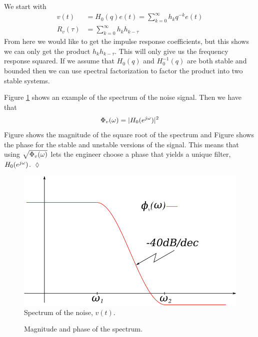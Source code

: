 \documentclass[lecture,12pt,]{pcms-l}
\begin{document}
We start with
\begin{align*}
v(t) &= H_0(q)e(t) = \sum_{k=0}^\infty h_kq^{-k}e(t) \\
R_v(\tau) &= \sum_{k=0}^\infty h_kh_{k-\tau}
\end{align*}
From here we would like to get the impulse response coefficients, but this shows we can only get the product $h_kh_{k-\tau}$. This will only give us the frequency response squared. If we assume that $H_0(q)$ and $H_0^{-1}(q)$ are both stable and bounded then we can use spectral factorization to factor the product into two stable systems.

\begin{example}
Figure \ref{fig:07spectrum} shows an example of the spectrum of the noise signal. Then we have that
$$\Phi_v(\omega) = |H_0(e^{j\omega})|^2$$
Figure  shows the magnitude of the square root of the spectrum and Figure  shows the phase for the stable and unstable versions of the signal. This means that using $\sqrt{\Phi_v(\omega)}$ lets the engineer choose a phase that yields a unique filter, $H_0(e^{j\omega})$.
$\lozenge$
\end{example}

\begin{figure}[ht!]
  \centering
  \includegraphics[width=.5\textwidth]{images/07spectrum}
  \caption{Spectrum of the noise, $v(t)$.}
  \label{fig:07spectrum}
\end{figure}

\begin{figure}[ht!]
  \centering
   \hfill
   \hfill
  \caption{Magnitude and phase of the spectrum.}
  \label{fig:07magphase}
\end{figure}
\end{document}
